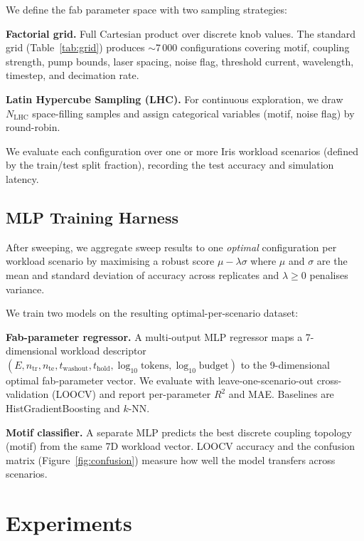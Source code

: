 \documentclass{article}
\begin{document}
We define the fab parameter space with two sampling strategies:

\textbf{Factorial grid.}
Full Cartesian product over discrete knob values.
The standard grid (Table~\ref{tab:grid}) produces $\sim$7\,000 configurations
covering motif, coupling strength, pump bounds, laser spacing, noise flag,
threshold current, wavelength, timestep, and decimation rate.

\textbf{Latin Hypercube Sampling (LHC).}
For continuous exploration, we draw $N_\mathrm{LHC}$ space-filling samples
\citep{mckinney2011pandas} and assign categorical variables (motif, noise flag)
by round-robin.

We evaluate each configuration over one or more Iris workload scenarios
(defined by the train/test split fraction), recording the test accuracy
and simulation latency.

\subsection{MLP Training Harness}
\label{sec:mlp}

After sweeping, we aggregate sweep results to one \emph{optimal} configuration
per workload scenario by maximising a robust score $\mu - \lambda\sigma$
where $\mu$ and $\sigma$ are the mean and standard deviation of accuracy across
replicates and $\lambda \geq 0$ penalises variance.

We train two models on the resulting optimal-per-scenario dataset:

\textbf{Fab-parameter regressor.}
A multi-output MLP regressor maps a 7-dimensional workload descriptor
$(E, n_\mathrm{tr}, n_\mathrm{te}, t_\mathrm{washout}, t_\mathrm{hold},
\log_{10}\text{tokens}, \log_{10}\text{budget})$
to the 9-dimensional optimal fab-parameter vector.
We evaluate with leave-one-scenario-out cross-validation (LOOCV) and report
per-parameter $R^2$ and MAE.
Baselines are HistGradientBoosting and $k$-NN.

\textbf{Motif classifier.}
A separate MLP predicts the best discrete coupling topology (motif) from
the same 7D workload vector.
LOOCV accuracy and the confusion matrix (Figure~\ref{fig:confusion}) measure
how well the model transfers across scenarios.

\section{Experiments}
\label{sec:experiments}
\end{document}
